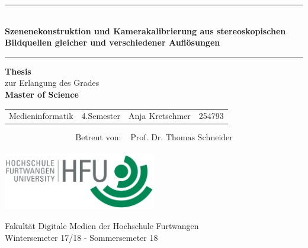\begin{titlepage}
\thispagestyle{empty}

\begin{center}
	\enlargethispage{3\baselineskip}
	\hrule
	
	\begin{center} \LARGE \textbf{\\Szenenekonstruktion und Kamerakalibrierung aus stereoskopischen Bildquellen gleicher und verschiedener Auflösungen}
	\end{center}
	
	\vspace{0.5cm}
	
	\hrule
	
	\vspace{2.5cm}
	
	{\Large \textbf{Thesis}\\ zur Erlangung des Grades\\[2ex]
	\textbf{Master of Science}}
	
	\vspace{3cm}
	
	\begin{tabular}{l l l l}
		Medieninformatik &4.Semester &Anja Kretschmer &254793 \vspace{0.2cm} \\	
	\end{tabular}
	
	\vspace{1cm}
	
	\begin{align*}
	\text{Betreut von: }  &\text{Prof. Dr. Thomas Schneider}\\
	\end{align*}	
	
	\vspace{1.0cm}
	
	
	\vspace{1.5cm}
	\includegraphics[width=0.5\textwidth]{./images/hfu_logo.png}

	Fakultät Digitale Medien der Hochschule Furtwangen\\[1ex]
	Wintersemeter 17/18 - Sommersemeter 18

\end{center}

\end{titlepage}